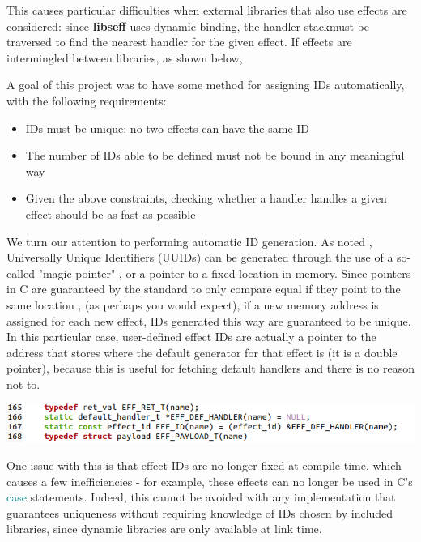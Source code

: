 \documentclass[logo,bsc,singlespacing,parskip,online]{infthesis}
\begin{document}
This causes particular difficulties when external libraries that also use effects are considered: since \textbf{libseff} uses dynamic binding, the handler stack\todo* must be traversed to find the nearest handler for the given effect. If effects are intermingled between libraries, as shown below, 

A goal of this project was to have some method for assigning IDs automatically, with the following requirements:

\begin{itemize}
\item IDs must be unique: no two effects can have the same ID
\item The number of IDs able to be defined must not be bound in any meaningful way
\item Given the above constraints, checking whether a handler handles a given effect should be as fast as possible
\end{itemize}

We turn our attention to performing automatic ID generation. As noted%
, Universally Unique Identifiers (UUIDs) can be generated through the use of a so-called "magic pointer"%
, or a pointer to a fixed location in memory. Since pointers in C are guaranteed by the standard to only compare equal if they point to the same location%
, (as perhaps you would expect), if a new memory address is assigned for each new effect, IDs generated this way are guaranteed to be unique. In this particular case, user-defined effect IDs are actually a pointer to the address that stores where the default generator for that effect is (it is a double pointer), because this is useful for fetching default handlers and there is no reason not to.

\includegraphics[scale=0.7]{ID_def_code.png}

One issue with this is that effect IDs are no longer fixed at compile time, which causes a few inefficiencies - for example, these effects can no longer be used in C's \textcolor{teal}{case} statements. Indeed, this cannot be avoided with any implementation that guarantees uniqueness without requiring knowledge of IDs chosen by included libraries, since dynamic libraries are only available at link time.
\end{document}
